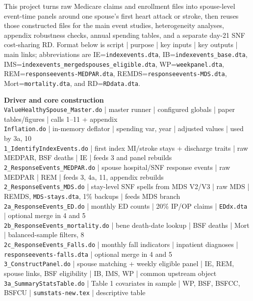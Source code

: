 \documentclass[11pt]{article}
\begin{document}
\noindent This project turns raw Medicare claims and enrollment files into spouse-level event-time panels around one spouse's first heart attack or stroke, then reuses those constructed files for the main event studies, heterogeneity analyses, appendix robustness checks, annual spending tables, and a separate day-21 SNF cost-sharing RD. Format below is script | purpose | key inputs | key outputs | main links; abbreviations are IE=\nolinkurl{indexevents.dta}, IB=\nolinkurl{indexevents_base.dta}, IMS=\nolinkurl{indexevents_mergedspouses_eligible.dta}, WP=\nolinkurl{weekpanel.dta}, REM=\nolinkurl{responseevents-MEDPAR.dta}, REMDS=\nolinkurl{responseevents-MDS.dta}, Mort=\nolinkurl{mortality.dta}, and RD=\nolinkurl{RDdata.dta}.

\medskip
\twocolumn
\raggedright
{\fontsize{5.0}{5.15}\selectfont
\textbf{Driver and core construction}\\
\nolinkurl{ValueHealthySpouse_Master.do} | master runner | configured globals | paper tables/figures | calls 1--11 + appendix\\
\nolinkurl{Inflation.do} | in-memory deflator | spending var, year | adjusted values | used by 3a, 10\\
\nolinkurl{1_IdentifyIndexEvents.do} | first index MI/stroke stays + discharge traits | raw MEDPAR, BSF deaths | IE | feeds 3 and panel rebuilds\\
\nolinkurl{2_ResponseEvents_MEDPAR.do} | spouse hospital/SNF response events | raw MEDPAR | REM | feeds 3, 4a, 11, appendix rebuilds\\
\nolinkurl{2_ResponseEvents_MDS.do} | stay-level SNF spells from MDS V2/V3 | raw MDS | REMDS, \nolinkurl{MDS-stays.dta}, 1\% backups | feeds MDS branch\\
\nolinkurl{2a_ResponseEvents_ED.do} | monthly ED counts | 20\% IP/OP claims | \nolinkurl{EDdx.dta} | optional merge in 4 and 5\\
\nolinkurl{2b_ResponseEvents_mortality.do} | bene death-date lookup | BSF deaths | Mort | balanced-sample filters, 8\\
\nolinkurl{2c_ResponseEvents_Falls.do} | monthly fall indicators | inpatient diagnoses | \nolinkurl{responseevents-falls.dta} | optional merge in 4 and 5\\
\nolinkurl{3_ConstructPanel.do} | spouse matching + weekly eligible panel | IE, REM, spouse links, BSF eligibility | IB, IMS, WP | common upstream object\\
\nolinkurl{3a_SummaryStatsTable.do} | Table 1 covariates in sample | WP, BSF, BSFCC, BSFCU | \nolinkurl{sumstats-new.tex} | descriptive table\\

}
\end{document}

